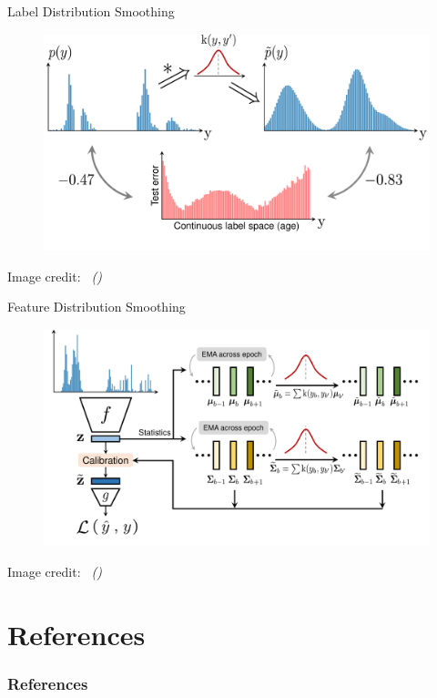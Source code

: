 \documentclass[dvipsnames,
hyperref={
	citecolor=blue,
	colorlinks=true,
	urlcolor=blue,
	linkcolor=,
}
]{beamer}
\newcommand{\credit}[2]{{\par\hfill \tiny #1 credit:~\itshape{\color{blue} \citeauthor{#2} (\citeyear{#2})}}}
\begin{document}
\begin{frame}{Label Distribution Smoothing}
	\begin{figure}[h]
		\includegraphics[width=\linewidth]{images/err_motivate_sep.pdf}
	\end{figure}
	\credit{Image}{yang2021delving}
\end{frame}

\begin{frame}{Feature Distribution Smoothing}
	\begin{figure}[h]
		\includegraphics[width=\linewidth]{images/teaser_fds.pdf}
	\end{figure}
	\credit{Image}{yang2021delving}
\end{frame}

\section{References}
\begin{frame}%
\frametitle{References}
\printbibliography
\end{frame}
\end{document}
